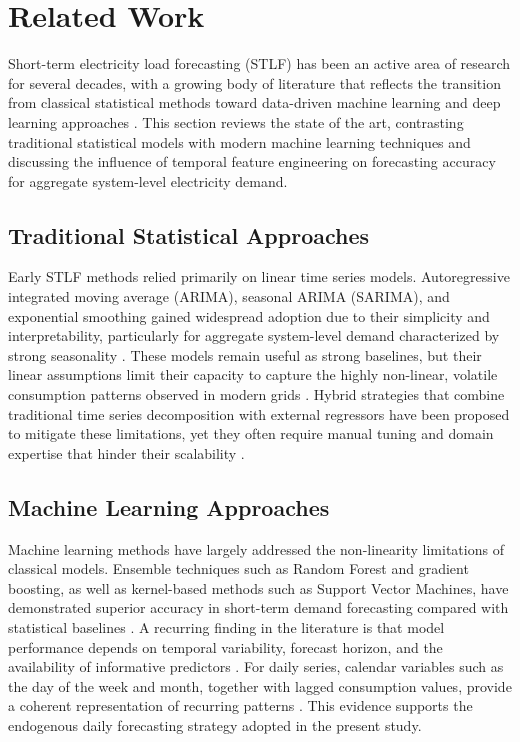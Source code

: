 \documentclass{ieeeaccess}
\begin{document}
\section{Related Work}
\label{sec:Related Work}
Short-term electricity load forecasting (STLF) has been an active area of research for several decades, with a growing body of literature that reflects the transition from classical statistical methods toward data-driven machine learning and deep learning approaches \cite{ref1,ref2,ref3}. This section reviews the state of the art, contrasting traditional statistical models with modern machine learning techniques and discussing the influence of temporal feature engineering on forecasting accuracy for aggregate system-level electricity demand.

\subsection{Traditional Statistical Approaches}
Early STLF methods relied primarily on linear time series models. Autoregressive integrated moving average (ARIMA), seasonal ARIMA (SARIMA), and exponential smoothing gained widespread adoption due to their simplicity and interpretability, particularly for aggregate system-level demand characterized by strong seasonality \cite{ref7}. These models remain useful as strong baselines, but their linear assumptions limit their capacity to capture the highly non-linear, volatile consumption patterns observed in modern grids \cite{ref1,ref10}. Hybrid strategies that combine traditional time series decomposition with external regressors have been proposed to mitigate these limitations, yet they often require manual tuning and domain expertise that hinder their scalability \cite{ref7,ref11}.

\subsection{Machine Learning Approaches}
Machine learning methods have largely addressed the non-linearity limitations of classical models. Ensemble techniques such as Random Forest and gradient boosting, as well as kernel-based methods such as Support Vector Machines, have demonstrated superior accuracy in short-term demand forecasting compared with statistical baselines \cite{ref7,ref8,ref12}. A recurring finding in the literature is that model performance depends on temporal variability, forecast horizon, and the availability of informative predictors \cite{ref1,ref8}. For daily series, calendar variables such as the day of the week and month, together with lagged consumption values, provide a coherent representation of recurring patterns \cite{ref8,ref12}. This evidence supports the endogenous daily forecasting strategy adopted in the present study.
\end{document}
